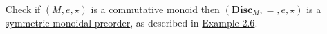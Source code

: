 Check if $(M,e,\star)$ is a commutative monoid then $(\mathbf{Disc}_M, =, e, \star)$ is a \hyperref[D2.2]{symmetric monoidal preorder}, as described in \hyperref[X2.6]{Example 2.6}.